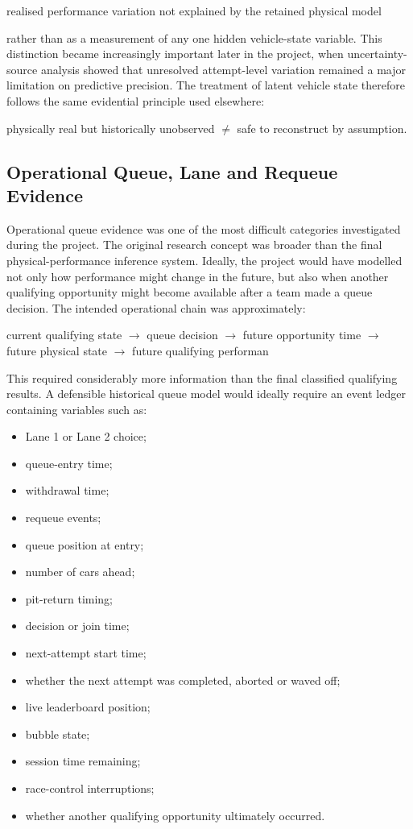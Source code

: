 realised performance variation not explained by the retained physical model

rather than as a measurement of any one hidden vehicle-state variable. This distinction became increasingly important later in the project, when uncertainty-source analysis showed that unresolved attempt-level variation remained a major limitation on predictive precision. The treatment of latent vehicle state therefore follows the same evidential principle used elsewhere:

physically real but historically unobserved \ensuremath{\neq} safe to reconstruct by assumption.

\subsection{Operational Queue, Lane and Requeue Evidence}
Operational queue evidence was one of the most difficult categories investigated during the project. The original research concept was broader than the final physical-performance inference system. Ideally, the project would have modelled not only how performance might change in the future, but also when another qualifying opportunity might become available after a team made a queue decision. The intended operational chain was approximately:

current qualifying state \ensuremath{\rightarrow} queue decision \ensuremath{\rightarrow} future opportunity time \ensuremath{\rightarrow} future physical state \ensuremath{\rightarrow} future qualifying performan

This required considerably more information than the final classified qualifying results. A defensible historical queue model would ideally require an event ledger containing variables such as:

\begin{itemize}
\item Lane 1 or Lane 2 choice;
\item queue-entry time;
\item withdrawal time;
\item requeue events;
\item queue position at entry;
\item number of cars ahead;
\item pit-return timing;
\item decision or join time;
\item next-attempt start time;
\item whether the next attempt was completed, aborted or waved off;
\item live leaderboard position;
\item bubble state;
\item session time remaining;
\item race-control interruptions;
\item whether another qualifying opportunity ultimately occurred.
\end{itemize}

